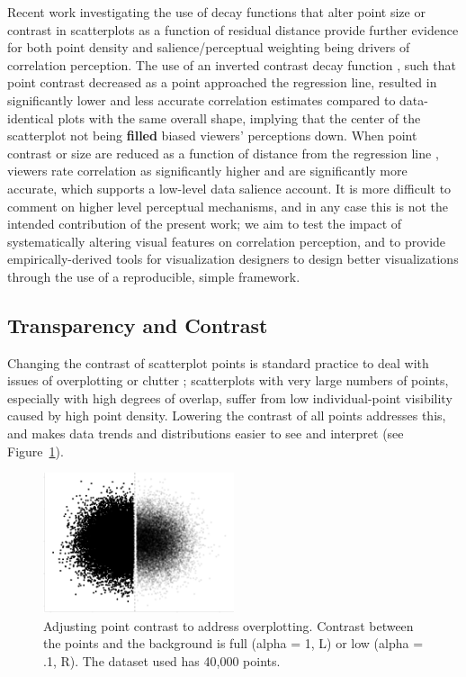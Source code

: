 \documentclass[manuscript, review, anonymous, screen]{acmart}
\begin{document}
Recent work investigating the use of decay functions that alter point
size or contrast in scatterplots as a function of residual distance
provide further evidence for both point density and salience/perceptual
weighting being drivers of correlation perception. The use of an
inverted contrast decay function \citep{strain_2023}, such that point
contrast decreased as a point approached the regression line, resulted
in significantly lower and less accurate correlation estimates compared
to data-identical plots with the same overall shape, implying that the
center of the scatterplot not being \textbf{filled} biased viewers'
perceptions down. When point contrast or size are reduced as a function
of distance from the regression line \citep{strain_2023, strain_2023b},
viewers rate correlation as significantly higher and are significantly
more accurate, which supports a low-level data salience account. It is
more difficult to comment on higher level perceptual mechanisms, and in
any case this is not the intended contribution of the present work; we
aim to test the impact of systematically altering visual features on
correlation perception, and to provide empirically-derived tools for
visualization designers to design better visualizations through the use
of a reproducible, simple framework.

\hypertarget{sec-transparency-and-contrast}{%
\subsection{Transparency and
Contrast}\label{sec-transparency-and-contrast}}

Changing the contrast of scatterplot points is standard practice to deal
with issues of overplotting or clutter
\citep{matejka_2015, bertini_2004}; scatterplots with very large numbers
of points, especially with high degrees of overlap, suffer from low
individual-point visibility caused by high point density. Lowering the
contrast of all points addresses this, and makes data trends and
distributions easier to see and interpret (see
Figure~\ref{fig-overplotting-examples}).

\begin{figure}

\includegraphics[width=0.5\textwidth,height=\textheight]{size_and_contrast_new_files/figure-pdf/fig-overplotting-examples-1.pdf} \hfill{}

\caption{\label{fig-overplotting-examples}Adjusting point contrast to
address overplotting. Contrast between the points and the background is
full (alpha = 1, L) or low (alpha = .1, R). The dataset used has 40,000
points.}

\end{figure}
\end{document}
